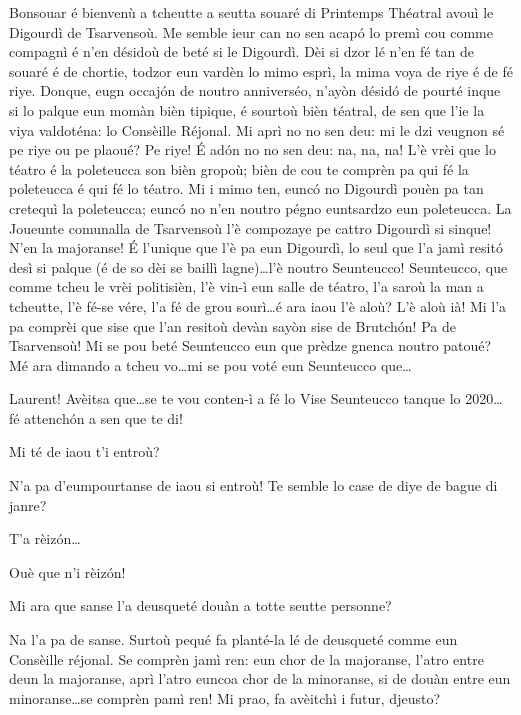 \begin{drama}

\Laurentspeaks Bonsouar é bienvenù a tcheutte a seutta souaré di Printemps Thé$\hat{a}$tral avouì le Digourdì de Tsarvensoù. Me semble ieur can no sen acapó lo premì cou comme compagnì é n'en désidoù de beté si le Digourdì. Dèi si dzor lé n'en fé tan de souaré é de chortie, todzor eun vardèn lo mimo esprì, la mima voya de riye é de fé riye. Donque, eugn occajón de noutro anniverséo, n’ayòn désidó de pourté inque si lo palque eun momàn bièn tipique, é sourtoù bièn téatral, de sen que l'ie la viya valdoténa: lo Consèille Réjonal. Mi aprì no no sen deu: mi le dzi veugnon sé pe riye ou pe plaoué? Pe riye! É ad\'on no no sen deu: na, na, na! L'è vrèi que lo téatro é la poleteucca son bièn gropoù; bièn de cou te comprèn pa qui fé la poleteucca é qui fé lo téatro. Mi i mimo ten, euncó no Digourdì pouèn pa tan cretequì la poleteucca; euncó no n'en noutro pégno euntsardzo eun poleteucca. La Joueunte comunalla de Tsarvensoù l'è compozaye pe cattro Digourdì si sinque! N'en la majoranse! \'E l'unique que l'è pa eun Digourdì, lo seul que l'a jamì resitó desì si palque (é de so dèi se baillì lagne)\ldots l'è noutro Seunteucco! Seunteucco, que comme tcheu le vrèi politisièn, l'è vin-ì eun salle de téatro, l'a saroù la man a tcheutte, l'è fé-se vére, l'a fé de grou sourì\ldots é ara iaou l'è aloù? L'è aloù ià! Mi l'a pa comprèi que sise que l'an resitoù devàn sayòn sise de Brutchón! Pa de Tsarvensoù! Mi se pou beté Seunteucco eun que prèdze gnenca noutro patoué? Mé ara dimando a tcheu vo\ldots mi se pou voté eun Seunteucco que\ldots


\Ronnyspeaks Laurent! Avèitsa que\ldots se te vou conten-ì a fé lo Vise Seunteucco tanque lo 2020\ldots fé attench\'on a sen que te di!

\Laurentspeaks Mi té de iaou t’i entroù?

\Ronnyspeaks N'a pa d'eumpourtanse de iaou si entroù! Te semble lo case  de diye de bague di janre?

\Laurentspeaks T'a rèiz\'on\ldots

\Ronnyspeaks Ouè que n'i rèiz\'on!

\Laurentspeaks Mi ara que sanse l'a deusqueté douàn a totte seutte personne?

\Ronnyspeaks Na l'a pa de sanse. Surtoù pequé fa planté-la lé de deusqueté comme eun Consèille réjonal. Se comprèn jamì ren: eun chor de la majoranse, l'atro entre deun la majoranse, aprì l'atro euncoa chor de la minoranse, si de douàn entre eun minoranse\ldots se comprèn pamì ren! Mi prao, fa avèitchì i futur, djeusto?


\end{drama}
